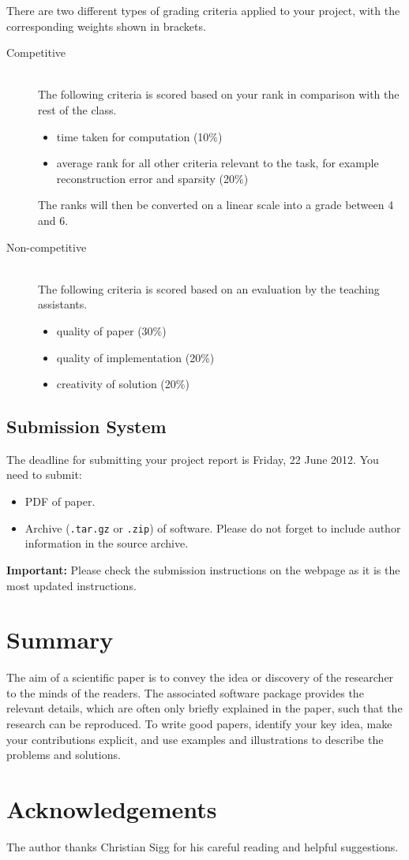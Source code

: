 \documentclass[10pt,conference,compsocconf]{IEEEtran}
\begin{document}
There are two different types of grading criteria applied to your
project, with the corresponding weights shown in brackets.
\begin{description}
\item[Competitive] \ \\
  The following criteria is scored based on your rank
  in comparison with the rest of the class.
  \begin{itemize}
  \item time taken for computation (10\%)
  \item average rank for all other criteria relevant to the task, for
    example reconstruction error and sparsity (20\%)
  \end{itemize}
  The ranks will then be converted on a linear scale into a grade
  between 4 and 6.
\item[Non-competitive] \ \\
  The following criteria is scored based on an
  evaluation by the teaching assistants.
  \begin{itemize}
  \item quality of paper (30\%)
  \item quality of implementation (20\%)
  \item creativity of solution (20\%)
  \end{itemize}
\end{description}

\subsection{Submission System}

The deadline for submitting your project report is Friday, 22 June
2012.
You need to submit:
\begin{itemize}
\item PDF of paper.
\item Archive (\texttt{.tar.gz} or \texttt{.zip}) of software. Please
  do not forget to include author information in the source archive.
\end{itemize}

\textbf{Important:} Please check the submission instructions on the webpage 
as it is the most updated instructions. 

\section{Summary}

The aim of a scientific paper is to convey the idea or discovery of
the researcher to the minds of the readers. The associated software
package provides the relevant details, which are often only briefly
explained in the paper, such that the research can be reproduced.
To write good papers, identify your key idea, make your contributions
explicit, and use examples and illustrations to describe the problems
and solutions.

\section*{Acknowledgements}
The author thanks Christian Sigg for his careful reading and helpful
suggestions.



\end{document}
